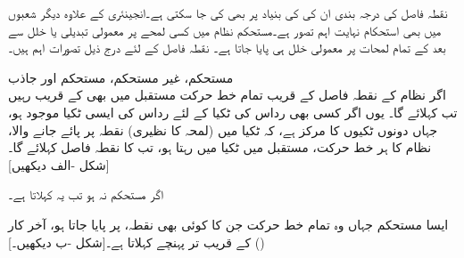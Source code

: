 نقطہ فاصل کی درجہ بندی ان کی  کی بنیاد پر بھی کی جا سکتی ہے۔انجینئری کے علاوہ دیگر شعبوں میں بھی  استحکام نہایت اہم تصور ہے۔مستحکم نظام میں کسی لمحے پر معمولی تبدیلی یا خلل سے بعد کے تمام لمحات پر معمولی خلل ہی پایا جاتا ہے۔ نقطہ فاصل کے لئے درج ذیل تصورات اہم ہیں۔

\quad مستحکم، غیر مستحکم، مستحکم اور جاذب\\
اگر نظام  کے نقطہ فاصل  کے قریب تمام خط حرکت مستقبل میں بھی  کے قریب رہیں تب    کہلائے گا۔ یوں اگر کسی بھی رداس  کی ٹکیا  کے لئے  رداس  کی ایسی ٹکیا  موجود ہو،  جہاں دونوں ٹکیوں کا مرکز  ہے، کہ  ٹکیا  میں (لمحہ  کا نظیری) نقطہ  پر  پائے جانے والا، نظام  کا ہر خط حرکت، مستقبل میں ٹکیا  میں رہتا ہو، تب  کا نقطہ فاصل  کہلائے گا۔[شکل -الف دیکھیں]

اگر  مستحکم نہ ہو تب یہ  کہلاتا ہے۔ 

ایسا مستحکم  جہاں وہ تمام خط حرکت جن کا کوئی بھی نقطہ،  پر پایا جاتا ہو، آخر کار ()  کے قریب تر پہنچے   کہلاتا ہے۔[شکل -ب دیکھیں۔]

